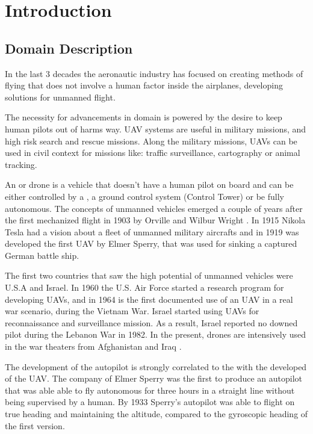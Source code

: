 \chapter{Introduction}
\label{chapter:intro}


\section{Domain Description}
\label{sec:domain}
In the last 3 decades the aeronautic industry has focused on creating methods 
of flying that does not involve a human factor inside the airplanes, developing
solutions for unmanned flight.

The necessity for advancements in  domain
is powered by the desire to keep human pilots out of harms way. UAV systems are 
useful in military missions, and high risk search and rescue missions. Along the
military missions, UAVs can be used in civil context for missions like: traffic
surveillance, cartography or animal tracking.

An  or drone is a vehicle that doesn't have
a human pilot on board and can be either controlled by a , 
a ground control system (Control Tower) or be fully autonomous. The concepts of 
unmanned vehicles emerged a couple of years after the first mechanized flight
in 1903 by Orville and Wilbur Wright \cite{learning-to-fly}. In 1915 Nikola
Tesla had a vision about a fleet of unmanned military aircrafts and in 1919 was
developed the first UAV by Elmer Sperry,  that was used for sinking a captured
German battle ship.

The first two countries that saw the high potential of unmanned vehicles were
U.S.A and Israel. In 1960 the U.S. Air Force started a research program for
developing UAVs,  and in 1964 is the first documented use of an UAV in a real
war scenario,  during the Vietnam War. Israel started using UAVs for 
reconnaissance and surveillance mission. As a result, Israel reported no downed 
pilot during the Lebanon War in 1982. In the present,  drones are intensively 
used in the war theaters from Afghanistan and Iraq \cite{eyes-of-the-army}.

The development of the autopilot is strongly correlated to the with the 
developed of the UAV. The company of Elmer Sperry was the first to produce
an autopilot that was able able to fly autonomous for three hours in a straight
line without being supervised by a human. By 1933 Sperry's autopilot was able to
flight on true heading and maintaining the altitude,  compared to the gyroscopic
heading of the first version.

